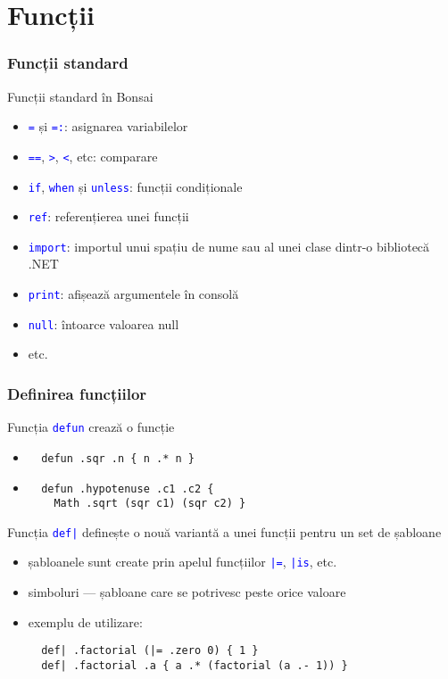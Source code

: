 \documentclass{beamer}
\renewcommand{\c}[1]{\textcolor{blue}{\texttt{#1}}}
\begin{document}
\section{Funcții}
\begin{frame}
  \frametitle{Funcții standard}
  Funcții standard în Bonsai
  \begin{itemize}
    \item \c{=} și \c{=:}: asignarea variabilelor
    \item \c{==}, \c{>}, \c{<}, etc: comparare 
    \item \c{if}, \c{when} și \c{unless}: funcții condiționale
    \item \c{ref}: referențierea unei funcții
    \item \c{import}: importul unui spațiu de nume sau al unei clase dintr-o bibliotecă .NET
    \item \c{print}: afișează argumentele în consolă
    \item \c{null}: întoarce valoarea null
    \item etc.
  \end{itemize}
\end{frame}

\begin{frame}[containsverbatim]
  \frametitle{Definirea funcțiilor}
  Funcția \c{defun} crează o funcție
  \begin{itemize}
  \item
    \color{blue}
    \begin{verbatim}
  defun .sqr .n { n .* n }\end{verbatim}
  \item
    \begin{verbatim}
  defun .hypotenuse .c1 .c2 { 
    Math .sqrt (sqr c1) (sqr c2) }\end{verbatim}
    \color{black}
  \end{itemize}
  \vskip8pt
  Funcția \c{def|} definește o nouă variantă a unei funcții pentru un set de șabloane
  \begin{itemize}
  \item șabloanele sunt create prin apelul funcțiilor \c{|=}, \c{|is}, etc.
  \item simboluri — șabloane care se potrivesc peste orice valoare
  \item exemplu de utilizare:
    \color{blue}
    \begin{verbatim}
  def| .factorial (|= .zero 0) { 1 }
  def| .factorial .a { a .* (factorial (a .- 1)) }\end{verbatim}
    \color{black}
  \end{itemize}
\end{frame}
\end{document}
